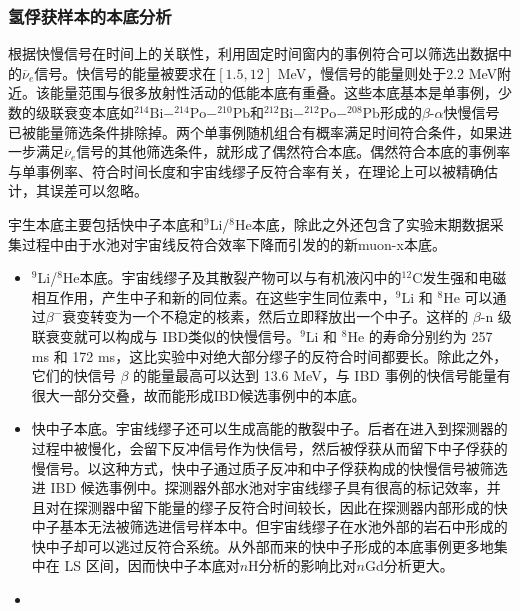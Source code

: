 \documentclass[a4paper,zihao=-4]{article}
\begin{document}
\subsubsection{氢俘获样本的本底分析}\label{sec:backgrounds}
根据快慢信号在时间上的关联性，利用固定时间窗内的事例符合可以筛选出数据中的$\overline{\nu}_e$信号。快信号的能量被要求在$[1.5, 12]$ MeV，慢信号的能量则处于2.2 MeV附近。该能量范围与很多放射性活动的低能本底有重叠。这些本底基本是单事例，少数的级联衰变本底如$^{214}\text{Bi}-^{214}\text{Po}-^{210}\text{Pb}$和$^{212}\text{Bi}-^{212}\text{Po}-^{208}\text{Pb}$形成的$\beta$-$\alpha$快慢信号已被能量筛选条件排除掉。两个单事例随机组合有概率满足时间符合条件，如果进一步满足$\overline{\nu}_e$信号的其他筛选条件，就形成了偶然符合本底。偶然符合本底的事例率与单事例率、符合时间长度和宇宙线缪子反符合率有关，在理论上可以被精确估计，其误差可以忽略。

宇生本底主要包括快中子本底和$^9$Li/$^8$He本底，除此之外还包含了实验末期数据采集过程中由于水池对宇宙线反符合效率下降而引发的的新muon-x本底。
\begin{itemize}
	\item $^9$Li/$^8$He本底。宇宙线缪子及其散裂产物可以与有机液闪中的$^{12}$C发生强和电磁相互作用，产生中子和新的同位素。在这些宇生同位素中，$^9$Li 和 $^8$He 可以通过$\beta^-$衰变转变为一个不稳定的核素，然后立即释放出一个中子。这样的 $\beta$-n 级联衰变就可以构成与 IBD类似的快慢信号。$^9$Li 和 $^8$He 的寿命分别约为 257 ms 和 172 ms，这比实验中对绝大部分缪子的反符合时间都要长。除此之外，它们的快信号 $\beta$ 的能量最高可以达到 13.6 MeV，与 IBD 事例的快信号能量有很大一部分交叠，故而能形成IBD候选事例中的本底。
	\item 快中子本底。宇宙线缪子还可以生成高能的散裂中子。后者在进入到探测器的过程中被慢化，会留下反冲信号作为快信号，然后被俘获从而留下中子俘获的慢信号。以这种方式，快中子通过质子反冲和中子俘获构成的快慢信号被筛选进 IBD 候选事例中。探测器外部水池对宇宙线缪子具有很高的标记效率，并且对在探测器中留下能量的缪子反符合时间较长，因此在探测器内部形成的快中子基本无法被筛选进信号样本中。但宇宙线缪子在水池外部的岩石中形成的快中子却可以逃过反符合系统。从外部而来的快中子形成的本底事例更多地集中在 LS 区间，因而快中子本底对$n$H分析的影响比对$n$Gd分析更大。
	\item {}
\end{itemize}
\end{document}
